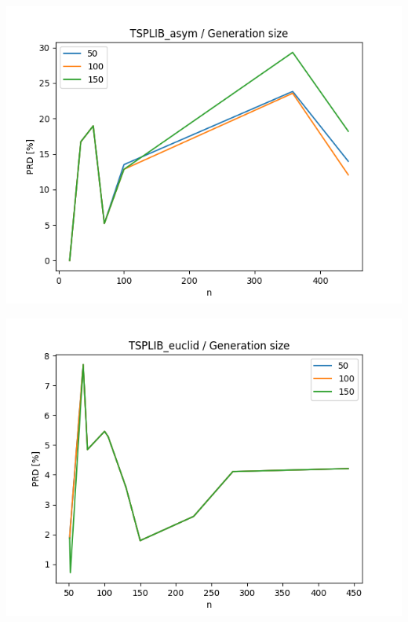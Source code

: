 \documentclass{article}
\begin{document}
\begin{center}
\includegraphics[width=\textwidth, 
                   height = 0.4\textheight, 
                   keepaspectratio]
                  {plots/tsplib_asym_3_generation_size} 
\end{center}

\begin{center}
\includegraphics[width=\textwidth, 
                   height = 0.4\textheight, 
                   keepaspectratio]
                  {plots/tsplib_euclid_3_generation_size} 
\end{center}
\end{document}
